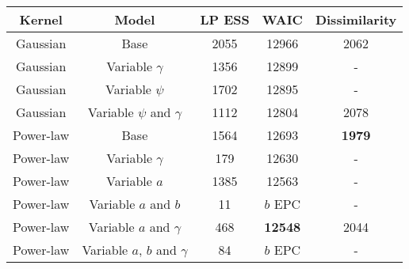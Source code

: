 \begin{table}
\begin{center}
\begin{tabular}{ccccc} 
\toprule
Kernel    & Model                          & LP ESS & WAIC           & Dissimilarity \\ \midrule
Gaussian  & Base                           & 2055   & 12966          & 2062 \\
Gaussian  & Variable $\gamma$              & 1356   & 12899          &  -   \\
Gaussian  & Variable $\psi$                & 1702   & 12895          &  -   \\   
Gaussian  & Variable $\psi$ and $\gamma$   & 1112   & 12804          & 2078 \\
Power-law & Base                           & 1564   & 12693          & \textbf{1979} \\
Power-law & Variable $\gamma$              & 179    & 12630          &  -   \\
Power-law & Variable $a$                   & 1385   & 12563          &  -   \\
Power-law & Variable $a$ and $b$           & 11     & $b$ EPC        &  -   \\
Power-law & Variable $a$ and $\gamma$      & 468    & \textbf{12548} & 2044 \\  
Power-law & Variable $a$, $b$ and $\gamma$ & 84     & $b$ EPC        &  -   \\

\end{tabular}
\end{center}
\end{table}
